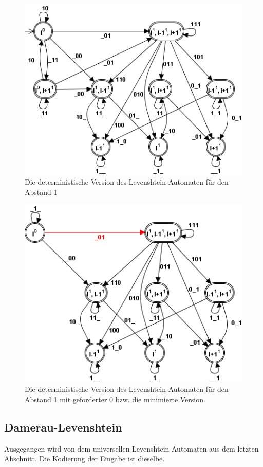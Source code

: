 \begin{figure}[htbp]
\centering
\includegraphics[scale=0.7]{pic/automata/unidlevenshteina}%
\caption{Die deterministische Version des Levenshtein-Automaten für den Abstand 1}%
\end{figure}
\begin{figure}[htbp]
\centering
\includegraphics[scale=0.7]{pic/automata/unidlevenshteinb}%
\caption{Die deterministische Version des Levenshtein-Automaten für den Abstand 1 mit geforderter 0 bzw. die minimierte Version.}%
\end{figure}
\subsection{Damerau-Levenshtein}
Ausgegangen wird von dem universellen Levenshtein-Automaten aus dem letzten Abschnitt. Die Kodierung der Eingabe ist dieselbe.

